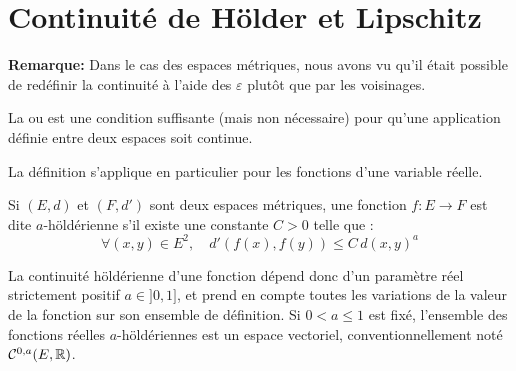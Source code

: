 \ifVersionDuDocEstVincent\medskip\fi
\section{Continuité de Hölder et Lipschitz}%

\textbf{Remarque:}
Dans le cas des espaces métriques, nous avons vu qu'il était possible
de redéfinir la continuité à l'aide des $\varepsilon$ plutôt que
par les voisinages.

\bigskip
{}
\ifVersionDuDocEstVincent\medskip\fi
La  ou 
est une condition suffisante (mais non nécessaire) pour qu'une application définie entre
deux espaces  soit continue.

La définition s'applique en particulier pour les fonctions d'une variable réelle.

\ifVersionDuDocEstVincent\medskip\fi
\begin{definition}
Si $(E, d)$ et $(F, d')$ sont deux espaces métriques, une fonction $f : E \rightarrow F$ est dite
$a$-höldérienne s'il existe une constante $C > 0$ telle que :
\begin{equation}
    \forall (x, y) \in E^2,\quad d'\left(f(x), f(y)\right) \le C\,d\left(x,y\right)^a
\end{equation}
\end{definition}
\ifVersionDuDocEstVincent\medskip\fi
La continuité höldérienne d'une fonction dépend donc d'un paramètre réel
strictement positif $a \in ]0, 1]$, et prend en compte toutes les variations de la valeur de
la fonction sur son ensemble de définition.
\ifVersionDuDocEstVincent\medskip\fi
Si $0 < a \leq1$ est fixé, l'ensemble des fonctions réelles $a$-höldériennes est un
espace vectoriel, conventionnellement noté $\mathcal{C}^{0, a}(E,\mathbb R)$.

